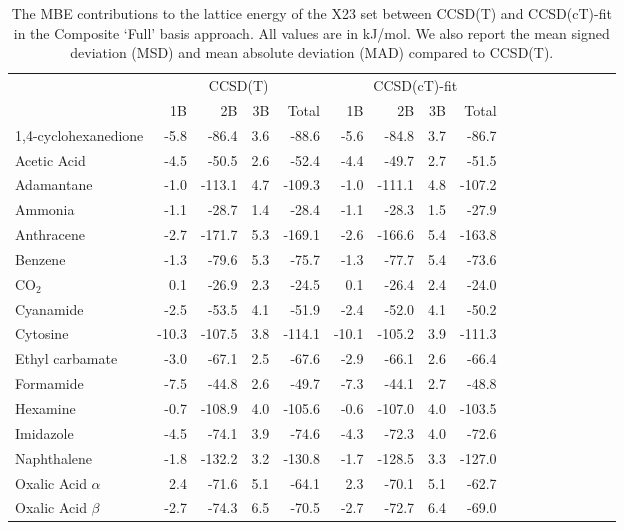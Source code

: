 \begin{table}[h]

\caption{\label{tab:x23_cT_mbe_contributions}The MBE contributions to the lattice energy of the X23 set between CCSD(T) and CCSD(cT)-fit in the Composite `Full' basis approach. All values are in kJ/mol. We also report the mean signed deviation (MSD) and mean absolute deviation (MAD) compared to CCSD(T).}
\begin{tabular}{lrrrrrrrrrrrrrrrr}
\toprule
 & \multicolumn{4}{c}{CCSD(T)} & \multicolumn{4}{c}{CCSD(cT)-fit} \\ \cmidrule(lr){2-5} \cmidrule(lr){6-9} \cmidrule(lr){10-13} \cmidrule(lr){14-17} 
 & 1B & 2B & 3B & Total & 1B & 2B & 3B & Total \\
\midrule
1,4-cyclohexanedione & -5.8 & -86.4 & 3.6 & -88.6 & -5.6 & -84.8 & 3.7 & -86.7 \\
Acetic Acid & -4.5 & -50.5 & 2.6 & -52.4 & -4.4 & -49.7 & 2.7 & -51.5 \\
Adamantane & -1.0 & -113.1 & 4.7 & -109.3 & -1.0 & -111.1 & 4.8 & -107.2 \\
Ammonia & -1.1 & -28.7 & 1.4 & -28.4 & -1.1 & -28.3 & 1.5 & -27.9 \\
Anthracene & -2.7 & -171.7 & 5.3 & -169.1 & -2.6 & -166.6 & 5.4 & -163.8 \\
Benzene & -1.3 & -79.6 & 5.3 & -75.7 & -1.3 & -77.7 & 5.4 & -73.6 \\
CO$_2$ & 0.1 & -26.9 & 2.3 & -24.5 & 0.1 & -26.4 & 2.4 & -24.0 \\
Cyanamide & -2.5 & -53.5 & 4.1 & -51.9 & -2.4 & -52.0 & 4.1 & -50.2 \\
Cytosine & -10.3 & -107.5 & 3.8 & -114.1 & -10.1 & -105.2 & 3.9 & -111.3 \\
Ethyl carbamate & -3.0 & -67.1 & 2.5 & -67.6 & -2.9 & -66.1 & 2.6 & -66.4 \\
Formamide & -7.5 & -44.8 & 2.6 & -49.7 & -7.3 & -44.1 & 2.7 & -48.8 \\
Hexamine & -0.7 & -108.9 & 4.0 & -105.6 & -0.6 & -107.0 & 4.0 & -103.5 \\
Imidazole & -4.5 & -74.1 & 3.9 & -74.6 & -4.3 & -72.3 & 4.0 & -72.6 \\
Naphthalene & -1.8 & -132.2 & 3.2 & -130.8 & -1.7 & -128.5 & 3.3 & -127.0 \\
Oxalic Acid $\alpha$ & 2.4 & -71.6 & 5.1 & -64.1 & 2.3 & -70.1 & 5.1 & -62.7 \\
Oxalic Acid $\beta$ & -2.7 & -74.3 & 6.5 & -70.5 & -2.7 & -72.7 & 6.4 & -69.0 \\

\end{tabular}
\end{table}
